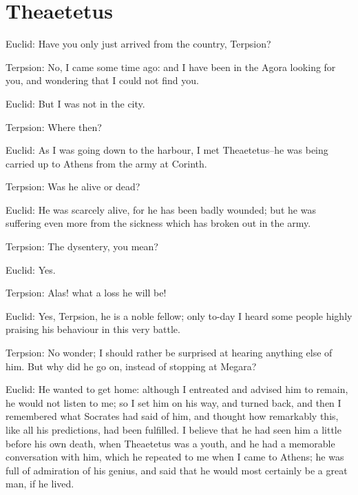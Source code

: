 

\chapter{Theaetetus} %
\label{cha:theaetetus}













Euclid: Have you only just arrived from the country, Terpsion?

Terpsion: No, I came some time ago: and I have been in the Agora looking
for you, and wondering that I could not find you.

Euclid: But I was not in the city.

Terpsion: Where then?

Euclid: As I was going down to the harbour, I met Theaetetus--he was
being carried up to Athens from the army at Corinth.

Terpsion: Was he alive or dead?

Euclid: He was scarcely alive, for he has been badly wounded; but he was
suffering even more from the sickness which has broken out in the army.

Terpsion: The dysentery, you mean?

Euclid: Yes.

Terpsion: Alas! what a loss he will be!

Euclid: Yes, Terpsion, he is a noble fellow; only to-day I heard some
people highly praising his behaviour in this very battle.

Terpsion: No wonder; I should rather be surprised at hearing anything
else of him. But why did he go on, instead of stopping at Megara?

Euclid: He wanted to get home: although I entreated and advised him to
remain, he would not listen to me; so I set him on his way, and turned
back, and then I remembered what Socrates had said of him, and thought
how remarkably this, like all his predictions, had been fulfilled.
I believe that he had seen him a little before his own death, when
Theaetetus was a youth, and he had a memorable conversation with him,
which he repeated to me when I came to Athens; he was full of admiration
of his genius, and said that he would most certainly be a great man, if
he lived.

